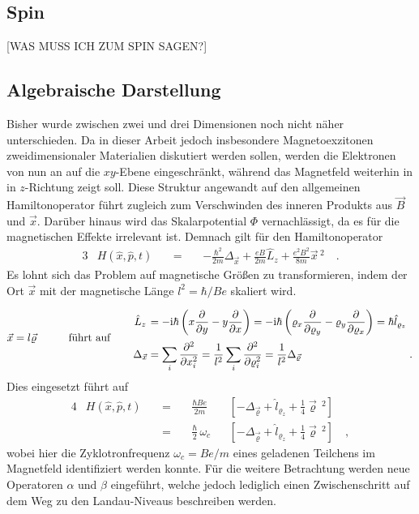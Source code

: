 \documentclass[a4paper,11pt]{article}
\newcommand{\+}{\dagger}
\newcommand{\pd}[2]{\frac{\partial #1}{\partial #2}}
\renewcommand{\it}{\mathit}
\renewcommand{\v}{\vec}
\renewcommand{\^}{\hat}
\renewcommand{\tt}{\text}
\renewcommand{\~}{\widetilde}
\begin{document}
\subsection{Spin}
[WAS MUSS ICH ZUM SPIN SAGEN?]
\subsection{Algebraische Darstellung}
Bisher wurde zwischen zwei und drei Dimensionen noch nicht näher unterschieden. Da in dieser Arbeit jedoch insbesondere Magnetoexzitonen zweidimensionaler Materialien diskutiert werden sollen, werden die Elektronen von nun an auf die $xy$-Ebene eingeschränkt, während das Magnetfeld weiterhin in in $z$-Richtung zeigt soll. Diese Struktur angewandt auf den allgemeinen Hamiltonoperator führt zugleich zum Verschwinden des inneren Produkts aus $\v B$ und $\v x$. Darüber hinaus wird das Skalarpotential $\it \Phi$ vernachlässigt, da es für die magnetischen Effekte irrelevant ist. Demnach gilt für den Hamiltonoperator 
\begin{alignat*}{3}
& H(\^ x,\^ p,t)&& \ =\  && -\frac{\hbar^2}{2m}\Delta_{\v x} + \frac{eB}{2m} \^L_z  +\frac{e^2B^2}{8m}\v x \,^2  \quad .
\end{alignat*}
Es lohnt sich das Problem auf magnetische Größen zu transformieren, indem der Ort $\v x$ mit der magnetische Länge $l^2=\hbar / Be$ skaliert wird.
\begin{alignat*}{4}
\v x  = l \v \varrho  &&\qquad \tt{führt auf} \quad && 
\arraycolsep=1.4pt\def\arraystretch{2.2}
\begin{array}{*1{>{\displaystyle}c} *1{>{\displaystyle}l} *1{>{\displaystyle}r}}
 \^L_z  &= -\tt i \hbar \left (x\pd{}{y}-y\pd{}{x}\right ) =  -\tt i \hbar \left (\varrho_x\pd{}{\varrho_y}-\varrho_y\pd{}{\varrho_x}\right ) = \hbar \^l_{\varrho_z}& \\[4pt]
\Delta_{\v x} &= \sum_i \pd{^2}{x_i ^2} = \frac{1}{l^2}\sum_i \pd{^2}{\varrho_i ^2} = \frac{1}{l^2}\Delta_{\v \varrho} &.
\end{array} 
\end{alignat*}
Dies eingesetzt führt auf  
\begin{alignat*}{4}
& H(\^ x,\^ p,t)&& \ =\  &&\frac{\hbar B e}{2m} && \left [ -\Delta_{\v \varrho} +  \^l_{\varrho_z}  +\frac{1}{4}\v \varrho \,^2 \right ] \\
& && \ = \ && \frac{\hbar }{2}\,\omega_c && \left [ -\Delta_{\v \varrho} +  \^l_{\varrho_z}  +\frac{1}{4}\v \varrho \,^2 \right ] \quad , 
\end{alignat*}
wobei hier die Zyklotronfrequenz $\omega_c= Be/m$ eines geladenen Teilchens im Magnetfeld identifiziert werden konnte. Für die weitere Betrachtung werden neue Operatoren $\alpha$ und $\beta$ eingeführt, welche jedoch lediglich einen Zwischenschritt auf dem Weg zu den Landau-Niveaus beschreiben werden.
\end{document}
